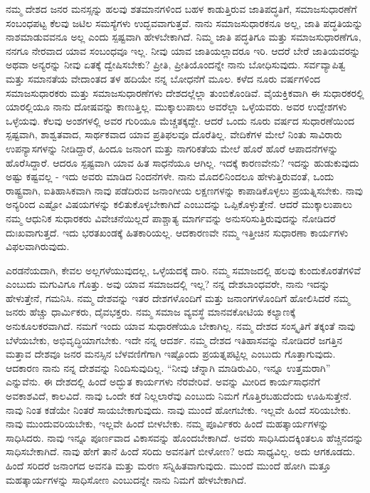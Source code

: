 ನಮ್ಮ ದೇಶದ ಜನರ ಮನಸ್ಸನ್ನು ಹಲವು ಶತಮಾನಗಳಿಂದ ಬಹಳ ಕಾಡುತ್ತಿರುವ ಜಾತಿಪದ್ಧತಿಗೆ, ಸಮಾಜಸುಧಾರಣೆಗೆ ಸಂಬಂಧಪಟ್ಟ ಕೆಲವು ಜಟಿಲ ಸಮಸ್ಯೆಗಳು ಉದ್ಭವವಾಗುತ್ತವೆ. ನಾನು ಸಮಾಜಸುಧಾರಕನೂ ಅಲ್ಲ, ಜಾತಿ ಪದ್ಧತಿಯನ್ನು ನಾಶಮಾಡುವವನೂ ಅಲ್ಲ ಎಂದು ಸ್ಪಷ್ಟವಾಗಿ ಹೇಳಬೇಕಾಗಿದೆ. ನಿಮ್ಮ ಜಾತಿ ಪದ್ಧತಿಗೂ ಮತ್ತು ಸಮಾಜಸುಧಾರಣೆಗೂ, ನನಗೂ ನೇರವಾದ ಯಾವ ಸಂಬಂಧವೂ ಇಲ್ಲ. ನೀವು ಯಾವ ಜಾತಿಯಲ್ಲಾದರೂ ಇರಿ. ಆದರೆ ಬೇರೆ ಜಾತಿಯವರನ್ನು ಅಥವಾ ಅನ್ಯರನ್ನು ನೀವು ಏತಕ್ಕೆ ದ್ವೇಷಿಸಬೇಕು? ಪ್ರೀತಿ, ಪ್ರೀತಿಯೊಂದನ್ನೇ ನಾನು ಬೋಧಿಸುವುದು. ಸರ್ವವ್ಯಾಪಿತ್ವ ಮತ್ತು ಸಮಾನತೆಯ ವೇದಾಂತದ ತಳ ಹದಿಯೇ ನನ್ನ ಬೋಧನೆಗೆ ಮೂಲ. ಕಳೆದ ನೂರು ವರ್ಷಗಳಿಂದ ಸಮಾಜಸುಧಾರಕರು ಮತ್ತು ಸಮಾಜಸುಧಾರಣೆಗಳು ದೇಶದಲ್ಲೆಲ್ಲಾ ತುಂಬಿಕೊಂಡಿವೆ. ವೈಯಕ್ತಿಕವಾಗಿ ಈ ಸುಧಾರಕರಲ್ಲಿ ಯಾರಲ್ಲಿಯೂ ನಾನು ದೋಷವನ್ನು ಕಾಣುತ್ತಿಲ್ಲ. ಮುಕ್ಕಾಲುಪಾಲು ಅವರೆಲ್ಲಾ ಒಳ್ಳೆಯವರು. ಅವರ ಉದ್ದೇಶಗಳು ಒಳ್ಳೆಯವು. ಕೆಲವು ಅಂಶಗಳಲ್ಲಿ ಅವರ ಗುರಿಯೂ ಮೆಚ್ಚತಕ್ಕದ್ದೇ. ಆದರೆ ಒಂದು ನೂರು ವರ್ಷದ ಸುಧಾರಣೆಯಿಂದ ಸ್ಪಷ್ಟವಾಗಿ, ಶಾಶ್ವತವಾದ, ಸಾರ್ಥಕವಾದ ಯಾವ ಪ್ರತಿಫಲವೂ ದೊರೆತಿಲ್ಲ. ವೇದಿಕೆಗಳ ಮೇಲೆ ನಿಂತು ಸಾವಿರಾರು ಉಪನ್ಯಾಸಗಳನ್ನು ನೀಡಿದ್ದಾರೆ, ಹಿಂದೂ ಜನಾಂಗ ಮತ್ತು ನಾಗರಿಕತೆಯ ಮೇಲೆ ಹೊರೆ ಹೊರೆ ಆಪಾದನೆಗಳನ್ನು ಹೊರೆಸಿದ್ದಾರೆ. ಆದರೂ ಸ್ಪಷ್ಟವಾಗಿ ಯಾವ ಹಿತ ಸಾಧನೆಯೂ ಆಗಿಲ್ಲ. ಇದಕ್ಕೆ ಕಾರಣವೇನು? ಇದನ್ನು ಹುಡುಕುವುದು ಅಷ್ಟು ಕಷ್ಟವಲ್ಲ - ಇದು ಅವರು ಮಾಡಿದ ನಿಂದನೆಗಳೇ. ನಾನು ಮೊದಲಿನಿಂದಲೂ ಹೇಳುತ್ತಿರುವಂತೆ, ಒಂದು ರಾಷ್ಟ್ರವಾಗಿ, ಐತಿಹಾಸಿಕವಾಗಿ ನಾವು ಪಡೆದಿರುವ ಜನಾಂಗೀಯ ಲಕ್ಷಣಗಳನ್ನು ಕಾಪಾಡಿಕೊಳ್ಳಲು ಪ್ರಯತ್ನಿಸಬೇಕು. ನಾವು ಅನ್ಯರಿಂದ ಎಷ್ಟೋ ವಿಷಯಗಳನ್ನು ಕಲಿತುಕೊಳ್ಳಬೇಕಾಗಿದೆ ಎಂಬುದನ್ನು ಒಪ್ಪಿಕೊಳ್ಳುತ್ತೇನೆ. ಆದರೆ ಮುಕ್ಕಾಲುಪಾಲು ನಮ್ಮ ಆಧುನಿಕ ಸುಧಾರಕರು ವಿವೇಚನೆಯಿಲ್ಲದೆ ಪಾಶ್ಚಾತ್ಯ ಮಾರ್ಗವನ್ನು ಅನುಸರಿಸುತ್ತಿರುವುದನ್ನು ನೋಡಿದರೆ ದುಃಖವಾಗುತ್ತದೆ. ಇದು ಭರತಖಂಡಕ್ಕೆ ಹಿತಕಾರಿಯಲ್ಲ. ಆದಕಾರಣವೇ ನಮ್ಮ ಇತ್ತೀಚಿನ ಸುಧಾರಣಾ ಕಾರ್ಯಗಳು ವಿಫಲವಾಗಿರುವುದು.

ಎರಡನೆಯದಾಗಿ, ಕೇವಲ ಅಲ್ಲಗಳೆಯುವುದಲ್ಲ, ಒಳ್ಳೆಯದಕ್ಕೆ ದಾರಿ. ನಮ್ಮ ಸಮಾಜದಲ್ಲಿ ಹಲವು ಕುಂದುಕೊರತೆಗಳಿವೆ ಎಂಬುದು ಮಗುವಿಗೂ ಗೊತ್ತು. ಅವು ಯಾವ ಸಮಾಜದಲ್ಲಿ ಇಲ್ಲ? ನನ್ನ ದೇಶಬಾಂಧವರೇ, ನಾನು ಇದನ್ನು ಹೇಳುತ್ತೇನೆ, ಗಮನಿಸಿ. ನಮ್ಮ ದೇಶವನ್ನು ಇತರ ದೇಶಗಳೊಂದಿಗೆ ಮತ್ತು ಜನಾಂಗಗಳೊಂದಿಗೆ ಹೋಲಿಸಿದರೆ ನಮ್ಮ ಜನರು ಹೆಚ್ಚು ಧಾರ್ಮಿಕರು, ದೈವಭಕ್ತರು. ನಮ್ಮ ಸಮಾಜ ವ್ಯವಸ್ಥೆ ಮಾನವಕೋಟಿಯ ಕಲ್ಯಾಣಕ್ಕೆ ಅನುಕೂಲಕರವಾಗಿದೆ. ನಮಗೆ ಇಂದು ಯಾವ ಸುಧಾರಣೆಯೂ ಬೇಕಾಗಿಲ್ಲ. ನಮ್ಮ ದೇಶದ ಸಂಸ್ಕೃತಿಗೆ ತಕ್ಕಂತೆ ನಾವು ಬೆಳೆಯಬೇಕು, ಅಭಿವೃದ್ಧಿಯಾಗಬೇಕು. ಇದೇ ನನ್ನ ಆದರ್ಶ. ನಮ್ಮ ದೇಶದ ಇತಿಹಾಸವನ್ನು ನೋಡಿದರೆ ಜಗತ್ತಿನ ಮತ್ತಾವ ದೇಶವೂ ಜನರ ಮನಸ್ಸಿನ ಬೆಳವಣಿಗೆಗಾಗಿ ಇಷ್ಟೊಂದು ಪ್ರಯತ್ನಪಟ್ಟಿಲ್ಲ ಎಂಬುದು ಗೊತ್ತಾಗುವುದು. ಆದಕಾರಣ ನಾನು ನನ್ನ ದೇಶವನ್ನು ನಿಂದಿಸುವುದಿಲ್ಲ. “ನೀವು ಚೆನ್ನಾಗಿ ಮಾಡಿರುವಿರಿ, ಇನ್ನೂ ಉತ್ತಮರಾಗಿ” ಎನ್ನುವೆನು. ಈ ದೇಶದಲ್ಲಿ ಹಿಂದೆ ಅದ್ಭುತ ಕಾರ್ಯಗಳು ನೆರವೇರಿವೆ. ಅವನ್ನು ಮೀರಿದ ಕಾರ್ಯಸಾಧನೆಗೆ ಅವಕಾಶವಿದೆ, ಕಾಲವಿದೆ. ನಾವು ಒಂದೇ ಕಡೆ ನಿಲ್ಲಲಾರೆವು ಎಂಬುದು ನಿಮಗೆ ಗೊತ್ತಿರಬಹುದೆಂದು ಊಹಿಸುತ್ತೇನೆ. ನಾವು ನಿಂತ ಕಡೆಯೇ ನಿಂತರೆ ಸಾಯಬೇಕಾಗುವುದು. ನಾವು ಮುಂದೆ ಹೋಗಬೇಕು. ಇಲ್ಲವೇ ಹಿಂದೆ ಸರಿಯಬೇಕು. ನಾವು ಮುಂದುವರಿಯಬೇಕು, ಇಲ್ಲವೇ ಹಿಂದೆ ಬೀಳಬೇಕು. ನಮ್ಮ ಪೂರ್ವಿಕರು ಹಿಂದೆ ಮಹತ್ಕಾರ್ಯಗಳನ್ನು ಸಾಧಿಸಿದರು. ನಾವು ಇನ್ನೂ ಪೂರ್ಣವಾದ ವಿಕಾಸವನ್ನು ಹೊಂದಬೇಕಾಗಿದೆ. ಅವರು ಸಾಧಿಸಿದುದಕ್ಕಿಂತಲೂ ಹೆಚ್ಚಿನದನ್ನು ಸಾಧಿಸಬೇಕಾಗಿದೆ. ನಾವು ಹೇಗೆ ತಾನೆ ಹಿಂದೆ ಸರಿದು ಅವನತಿಗೆ ಬೀಳೋಣ? ಅದು ಸಾಧ್ಯವಿಲ್ಲ. ಅದು ಆಗಕೂಡದು. ಹಿಂದೆ ಸರಿದರೆ ಜನಾಂಗದ ಅವನತಿ ಮತ್ತು ಮರಣ ಸನ್ನಿಹಿತವಾಗುವುದು. ಮುಂದೆ ಮುಂದೆ ಹೋಗಿ ಮತ್ತೂ ಮಹತ್ಕಾರ್ಯಗಳನ್ನು ಸಾಧಿಸೋಣ ಎಂಬುದನ್ನೇ ನಾನು ನಿಮಗೆ ಹೇಳಬೇಕಾಗಿದೆ.

